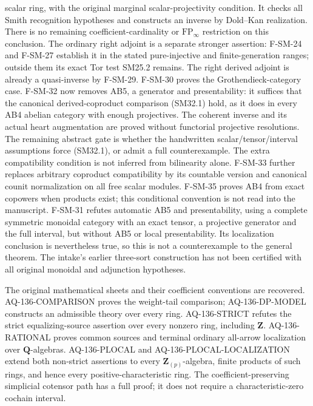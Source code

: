 \begin{description}[style=nextline,leftmargin=0pt]
scalar ring, with the original marginal scalar-projectivity condition.
It checks all Smith recognition hypotheses and constructs an inverse
by Dold--Kan realization. There is no remaining coefficient-cardinality
or $\mathrm{FP}_\infty$ restriction on this conclusion.
The ordinary right adjoint is a separate stronger assertion:
F-SM-24 and F-SM-27 establish it in the stated pure-injective and
finite-generation ranges; outside them its exact Tor test SM25.2
remains. The right derived adjoint is already a quasi-inverse by
F-SM-29. F-SM-30 proves the Grothendieck-category case.
F-SM-32 now removes AB5, a generator and presentability: it suffices
that the canonical derived-coproduct comparison (SM32.1) hold, as it
does in every AB4 abelian category with enough projectives. The
coherent inverse and its actual heart augmentation are proved without
functorial projective resolutions. The remaining abstract gate is
whether the handwritten scalar/tensor/interval assumptions force
(SM32.1), or admit a full counterexample. The extra compatibility
condition is not inferred from bilinearity alone. F-SM-33 further replaces arbitrary coproduct compatibility by its
countable version and canonical counit normalization on all free scalar
modules. F-SM-35 proves AB4 from exact copowers when products exist;
this conditional convention is not read into the manuscript.
F-SM-31 refutes automatic AB5 and presentability,
using a complete symmetric monoidal category with an exact tensor,
a projective generator and the full interval, but without AB5 or
local presentability. Its localization conclusion is nevertheless
true, so this is not a counterexample to the general theorem.
The intake's earlier
three-sort construction has not been certified with all original
monoidal and adjunction hypotheses.
\item[Cote 136, physical 111--121: the integral non-strict questions.]
The original mathematical sheets and their coefficient conventions
are recovered. AQ-136-COMPARISON proves the weight-tail comparison;
AQ-136-DP-MODEL constructs an admissible theory over every ring.
AQ-136-STRICT refutes the strict equalizing-source assertion over
every nonzero ring, including $\mathbf Z$.
AQ-136-RATIONAL proves common sources and terminal ordinary
all-arrow localization over $\mathbf Q$-algebras.
AQ-136-PLOCAL and AQ-136-PLOCAL-LOCALIZATION extend both non-strict
assertions to every $\mathbf Z_{(p)}$-algebra, finite products of such
rings, and hence every positive-characteristic ring.
The coefficient-preserving simplicial cotensor path has a full proof;
it does not require a characteristic-zero cochain interval.

\end{description}
